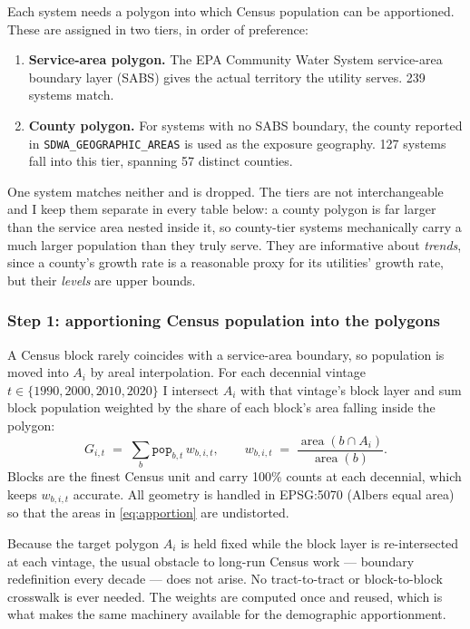 Each system needs a polygon into which Census population can be apportioned.
These are assigned in two tiers, in order of preference:

\begin{enumerate}
  \item \textbf{Service-area polygon.} The EPA Community Water System service-area
    boundary layer (SABS) gives the actual territory the utility serves. 239
    systems match.
  \item \textbf{County polygon.} For systems with no SABS boundary, the county
    reported in \texttt{SDWA\_GEOGRAPHIC\_AREAS} is used as the exposure geography.
    127 systems fall into this tier, spanning 57 distinct counties.
\end{enumerate}

One system matches neither and is dropped. The tiers are not interchangeable and
I keep them separate in every table below: a county polygon is far larger than
the service area nested inside it, so county-tier systems mechanically carry a
much larger population than they truly serve. They are informative about
\emph{trends}, since a county's growth rate is a reasonable proxy for its
utilities' growth rate, but their \emph{levels} are upper bounds.

\subsubsection{Step 1: apportioning Census population into the polygons}

A Census block rarely coincides with a service-area boundary, so population is
moved into $A_i$ by areal interpolation. For each decennial vintage
$t\in\{1990,2000,2010,2020\}$ I intersect $A_i$ with that vintage's block layer
and sum block population weighted by the share of each block's area falling
inside the polygon:
%
\begin{equation}
G_{i,t} \;=\; \sum_{b} \texttt{pop}_{b,t}\, w_{b,i,t},
\qquad
w_{b,i,t} \;=\;
  \frac{\operatorname{area}\!\left(b \cap A_i\right)}{\operatorname{area}(b)} .
\label{eq:apportion}
\end{equation}
%
Blocks are the finest Census unit and carry 100\% counts at each decennial, which
keeps $w_{b,i,t}$ accurate. All geometry is handled in EPSG:5070 (Albers equal
area) so that the areas in \eqref{eq:apportion} are undistorted.

Because the target polygon $A_i$ is held fixed while the block layer is
re-intersected at each vintage, the usual obstacle to long-run Census
work --- boundary redefinition every decade --- does not arise. No
tract-to-tract or block-to-block crosswalk is ever needed. The weights are
computed once and reused, which is what makes the same machinery available for
the demographic apportionment.

